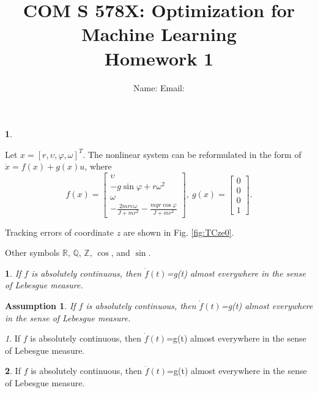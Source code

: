 \documentclass{article}
\newtheorem{assumption}{Assumption}
\theoremstyle{plain}
\newtheorem{thm}{\protect\theoremname}
\theoremstyle{remark}
\newtheorem{rem}{\protect\remarkname}
\theoremstyle{definition}
\newtheorem{problem}{\protect\problemname}
\theoremstyle{plain}
\theoremstyle{plain}
\providecommand{\problemname}{Problem}
\providecommand{\remarkname}{Remark}
\providecommand{\theoremname}{Theorem}
\begin{document}
\title{COM S 578X: Optimization for Machine Learning \\
Homework 1}
\author{Name: \qquad{}Email: }
\maketitle


\begin{problem}
\end{problem}

Let $x=[r,\upsilon,\varphi,\omega]^{T}$. The nonlinear system can
be reformulated in the form of $\dot{x}=f(x)+g(x)u$, where 
\[
f(x)=\left[\begin{array}{c}
\upsilon\\
-g\sin\varphi+r\omega^{2}\\
\omega\\
-\frac{2mr\upsilon\omega}{J+mr^{2}}-\frac{mgr\cos\varphi}{J+mr^{2}}
\end{array}\right],\ g(x)=\left[\begin{array}{c}
0\\
0\\
0\\
1
\end{array}\right].
\]


Tracking errors of coordinate $z$ are shown in Fig. \ref{fig:TCze0}. 

Other symbols $\mathbb{R}$, $\mathbb{Q}$, $\mathbb{Z}$, $\cos$,
and $\sin$. 

\begin{thm}
If $f$ is absolutely continuous, then $\dot{f}(t)$=g(t) almost everywhere in the sense of Lebesgue measure.
\end{thm}

\begin{assumption}
If $f$ is absolutely continuous, then $\dot{f}(t)$=g(t) almost everywhere in the sense of Lebesgue measure.
\end{assumption}

\begin{rem}
If $f$ is absolutely continuous, then $\dot{f}(t)$=g(t) almost everywhere in the sense of Lebesgue measure.
\end{rem}

\begin{problem}
If $f$ is absolutely continuous, then $\dot{f}(t)$=g(t) almost everywhere in the sense of Lebesgue measure.
\end{problem}
\end{document}
